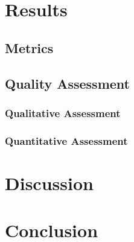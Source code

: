 \documentclass{report}
\begin{document}
	
	\chapter{Results}
	\section{Metrics}
	\section{Quality Assessment}
	\subsection{Qualitative Assessment}
	\subsection{Quantitative Assessment}
	\newpage
	
	\chapter{Discussion}
	\newpage
	
	\chapter{Conclusion}
	
	\newpage
	
	
\end{document}
